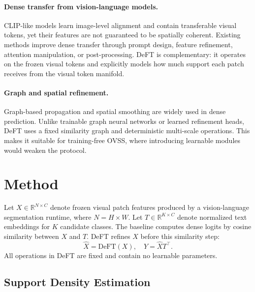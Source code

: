 \documentclass[letterpaper]{article}
\begin{document}
\paragraph{Dense transfer from vision-language models.}
CLIP-like models learn image-level alignment and contain transferable visual
tokens, yet their features are not guaranteed to be spatially coherent. Existing
methods improve dense transfer through prompt design, feature refinement,
attention manipulation, or post-processing. DeFT is complementary: it operates
on the frozen visual tokens and explicitly models how much support each patch
receives from the visual token manifold.

\paragraph{Graph and spatial refinement.}
Graph-based propagation and spatial smoothing are widely used in dense
prediction. Unlike trainable graph neural networks or learned refinement heads,
DeFT uses a fixed similarity graph and deterministic multi-scale operations.
This makes it suitable for training-free OVSS, where introducing learnable
modules would weaken the protocol.

\section{Method}

Let $X \in \mathbb{R}^{N \times C}$ denote frozen visual patch features produced
by a vision-language segmentation runtime, where $N=H \times W$. Let $T \in
\mathbb{R}^{K \times C}$ denote normalized text embeddings for $K$ candidate
classes. The baseline computes dense logits by cosine similarity between $X$
and $T$. DeFT refines $X$ before this similarity step:
\begin{equation}
    \hat{X} = \mathrm{DeFT}(X), \quad
    Y = \hat{X} T^\top.
\end{equation}
All operations in DeFT are fixed and contain no learnable parameters.

\subsection{Support Density Estimation}
\end{document}
